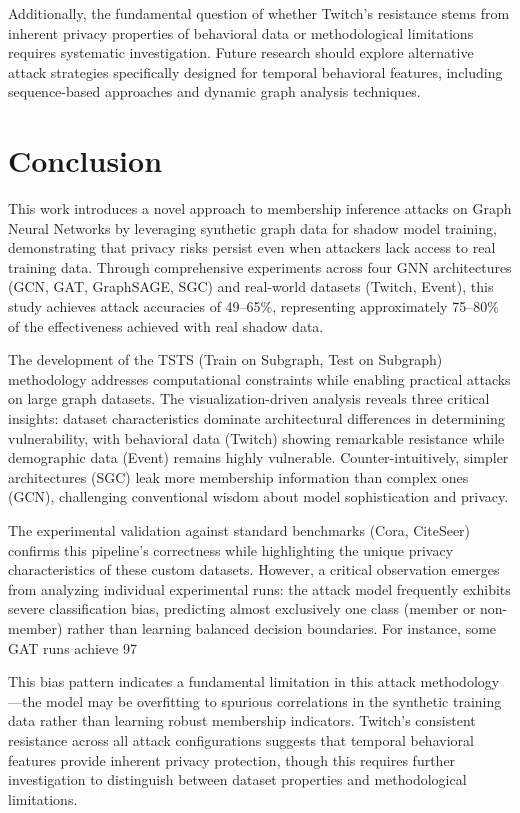 \documentclass{article}
\begin{document}
Additionally, the fundamental question of whether Twitch's resistance stems from inherent privacy properties of behavioral data or methodological limitations requires systematic investigation. Future research should explore alternative attack strategies specifically designed for temporal behavioral features, including sequence-based approaches and dynamic graph analysis techniques.

\section{Conclusion}
This work introduces a novel approach to membership inference attacks on Graph Neural Networks by leveraging synthetic graph data for shadow model training, demonstrating that privacy risks persist even when attackers lack access to real training data. Through comprehensive experiments across four GNN architectures (GCN, GAT, GraphSAGE, SGC) and real-world datasets (Twitch, Event), this study achieves attack accuracies of 49--65\%, representing approximately 75--80\% of the effectiveness achieved with real shadow data.

The development of the TSTS (Train on Subgraph, Test on Subgraph) methodology addresses computational constraints while enabling practical attacks on large graph datasets. The visualization-driven analysis reveals three critical insights: dataset characteristics dominate architectural differences in determining vulnerability, with behavioral data (Twitch) showing remarkable resistance while demographic data (Event) remains highly vulnerable. Counter-intuitively, simpler architectures (SGC) leak more membership information than complex ones (GCN), challenging conventional wisdom about model sophistication and privacy.

The experimental validation against standard benchmarks (Cora, CiteSeer) confirms this pipeline's correctness while highlighting the unique privacy characteristics of these custom datasets. However, a critical observation emerges from analyzing individual experimental runs: the attack model frequently exhibits severe classification bias, predicting almost exclusively one class (member or non-member) rather than learning balanced decision boundaries. For instance, some GAT runs achieve 97%

This bias pattern indicates a fundamental limitation in this attack methodology---the model may be overfitting to spurious correlations in the synthetic training data rather than learning robust membership indicators. Twitch's consistent resistance across all attack configurations suggests that temporal behavioral features provide inherent privacy protection, though this requires further investigation to distinguish between dataset properties and methodological limitations.
\end{document}
